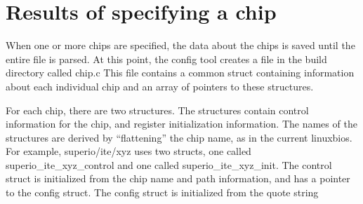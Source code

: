 \section{Results of specifying a chip}

When one or more chips are specified, the data about the chips
is saved until the entire file is parsed. At this point, the config tool
creates a file in the build directory called chip.c This file contains
a common struct containing information about
each individual chip and an array of pointers to these structures.

For each chip, there are two structures. The structures contain control
information for the chip, and register initialization information. The
names of the structures are derived by ``flattening'' the chip name,
as in the current linuxbios. For example, superio/ite/xyz uses
two structs, one called superio_ite_xyz_control and one called
superio_ite_xyz_init. The control struct is initialized from the
chip name and path information, and has a pointer to the
config struct. The config struct is initialized from the quote string

